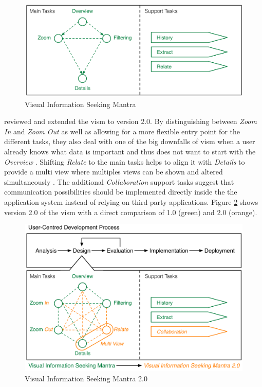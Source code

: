 \begin{figure}[h!]
	\begin{center}
		\includegraphics[width=12cm]{03_Figures/05_LitReview/Stauffer2016_VISM1.png}
		\caption[Visual Information Seeking Mantra]{Visual Information Seeking Mantra \citep{Stauffer2016}}
		\label{fig:vism}
	\end{center}
\end{figure} \newline
\cite{Stauffer2016} reviewed and extended the \gls{vism} to version 2.0. By distinguishing between \textit{Zoom In} and \textit{Zoom Out} as well as allowing for a more flexible entry point for the different tasks, they also deal with one of the big downfalls of \gls{vism} when a user already knows what data is important and thus does not want to start with the \textit{Overview} \citep{Neil2006}. Shifting \textit{Relate} to the main tasks helps to align it with \textit{Details} to provide a multi view where multiples views can be shown and altered simultaneously \citep{Stauffer2016}. The additional \textit{Collaboration} support tasks suggest that communication possibilities should be implemented directly inside the the application system instead of relying on third party applications. Figure \ref{fig:vism2} shows version 2.0 of the \gls{vism} with a direct comparison of 1.0 (green) and 2.0 (orange). \newline
\begin{figure}[h!]
	\begin{center}
		\includegraphics[width=12cm]{03_Figures/05_LitReview/Stauffer2016_VISM2.png}
		\caption[Visual Information Seeking Mantra 2.0]{Visual Information Seeking Mantra 2.0 \citep{Stauffer2016}}
		\label{fig:vism2}
	\end{center}
\end{figure}

